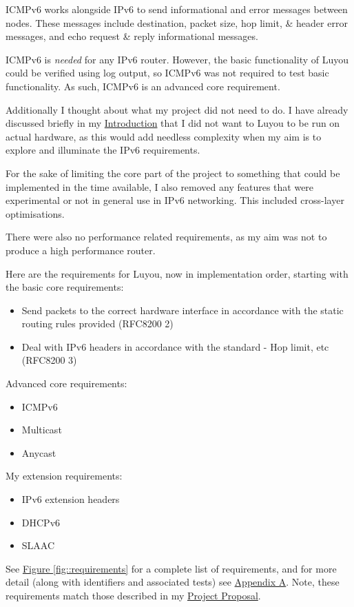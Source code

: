 \documentclass[12pt,a4paper,twoside,openright]{report}
\begin{document}
\bigskip

ICMPv6 works alongside IPv6 to send informational and error messages between nodes.  These messages include destination, packet size, hop limit, \& header error messages, and echo request \& reply informational messages. 

ICMPv6 is \textit{needed} for any IPv6 router.  However, the basic functionality of Luyou could be verified using log output, so ICMPv6 was not required to test basic functionality. As such, ICMPv6 is an advanced core requirement.

\bigskip

Additionally I thought about what my project did not need to do. I have already discussed briefly in my \hyperref[chap::introduction]{Introduction} that I did not want to Luyou to be run on actual hardware, as this would add needless complexity when my aim is to explore and illuminate the IPv6 requirements. 

For the sake of limiting the core part of the project to something that could be implemented in the time available, I also removed any features that were experimental or not in general use in IPv6 networking.  This included cross-layer optimisations.

There were also no performance related requirements, as my aim was not to produce a high performance router.

\bigskip

Here are the requirements for Luyou, now in implementation order, starting with the basic core requirements:
\begin{itemize}
\item Send packets to the correct hardware interface in accordance with the static routing rules provided (RFC8200 2\cite{ipv6_rfc})
\item Deal with IPv6 headers in accordance with the standard - Hop limit, etc (RFC8200 3\cite{ipv6_rfc})
\end{itemize}
Advanced core requirements:
\begin{itemize}
\item ICMPv6\cite{icmpv6_rfc}
\item Multicast\cite{ipv6_rfc_adr}
\item Anycast\cite{ipv6_rfc_adr}
\end{itemize}
My extension requirements:
\begin{itemize}
\item IPv6 extension headers\cite{ipv6_rfc}
\item DHCPv6\cite{dhcpv6_rfc}
\item SLAAC\cite{slaac_rfc}
\end{itemize}
See \hyperref[fig::requirements]{Figure }\ref{fig::requirements} for a complete list of requirements, and for more detail (along with identifiers and associated tests) see \hyperref[appendix::requirements]{Appendix A}. Note, these requirements match those described in my  \hyperref[appendix::proposal]{Project Proposal}.
\end{document}
